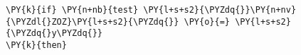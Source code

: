 \begin{Verbatim}[commandchars=\\\{\}]
\PY{k}{if} \PY{n+nb}{test} \PY{l+s+s2}{\PYZdq{}}\PY{n+nv}{\PYZdl{}ZOZ}\PY{l+s+s2}{\PYZdq{}} \PY{o}{=} \PY{l+s+s2}{\PYZdq{}y\PYZdq{}} 
\PY{k}{then}
\end{Verbatim}
